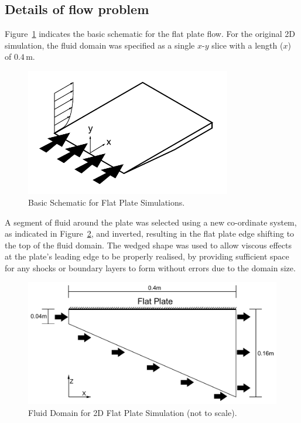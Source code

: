 \subsection{Details of flow problem}
Figure~\ref{f:tc1:scheme} indicates the basic schematic for the flat plate flow. For the original 2D simulation, the fluid domain was specified as a single $x$-$y$ slice with a length ($x$) of $0.4$\,m. 
%
\begin{figure}[htbp]
 \begin{center}
  \includegraphics[width=9cm]{./chap6-3Dflatplate/figs/schematic2.pdf}
  \caption{Basic Schematic for Flat Plate Simulations.}
  \label{f:tc1:scheme}
 \end{center}
\end{figure}
%
A segment of fluid around the plate was selected using a new co-ordinate system, as indicated in Figure~\ref{f:tc1:fluid}, and inverted, resulting in the flat plate edge shifting to the top of the fluid domain. The wedged shape was used to allow viscous effects at the plate's leading edge to be properly realised, by providing sufficient space for any shocks or boundary layers to form without errors due to the domain size. 
%
\begin{figure}[htbp]
 \begin{center}
  \includegraphics[width=12cm]{./chap6-3Dflatplate/figs/fluidvolume.pdf}
  \caption{Fluid Domain for 2D Flat Plate Simulation (not to scale).}
  \label{f:tc1:fluid}
 \end{center}
\end{figure}
%


